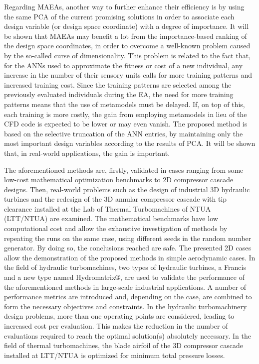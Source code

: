 Regarding MAEAs, another way to further enhance their efficiency is by using the same PCA of the current promising solutions in order to associate each design variable (or design space coordinate) with a degree of importance. It will be shown that MAEAs may benefit a lot from the importance-based ranking of the design space coordinates, in order to overcome a well-known problem caused by the so-called curse of dimensionality. This problem is related to the fact that, for the ANNs used to approximate the fitness or cost of a new individual, any increase in the number of their sensory units calls for more training patterns and increased training cost.  Since the training patterns are selected among the previously evaluated individuals during the EA, the need for more training patterns means that the use of metamodels must be delayed. If, on top of this, each training is more costly, the gain from employing metamodels in lieu of the CFD code is expected to be lower or may even vanish. The proposed method is based on the selective truncation of the ANN entries, by maintaining only the most important design variables according to the results of PCA. It will be shown that, in real-world applications, the gain is important.   

The aforementioned methods are, firstly, validated in cases ranging from  some low-cost mathematical optimization benchmarks to 2D compressor cascade designs. Then, real-world problems such as the design of industrial 3D hydraulic turbines and the redesign of the 3D annular compressor cascade with tip clearance installed at the Lab of Thermal Turbomachines of NTUA (LTT/NTUA) are examined. The mathematical benchmarks have low computational cost and allow the exhaustive investigation of methods by repeating the runs on the same case, using different seeds in the random number generator. By doing so, the conclusions reached are safe. The presented 2D cases allow the demonstration of the proposed methods in simple aerodynamic cases. In the field of hydraulic turbomachines, two types of hydraulic turbines, a Francis and a new type named Hydromatrix$\circledR$, are used to validate the performance of the aforementioned methods in large-scale industrial applications. A number of performance metrics are introduced and, depending on the case,  are combined to form the necessary objectives and constraints. In the hydraulic turbomachinery design problems, more than one operating points are considered, leading to increased cost per evaluation. This makes the reduction in the number of evaluations required to reach the optimal solution(s) absolutely necessary.  In the field of thermal turbomachines, the blade airfoil of the 3D compressor cascade installed at LTT/NTUA is optimized for minimum total pressure losses.     


